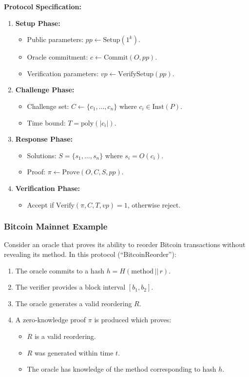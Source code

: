 \documentclass[11pt]{article}
\begin{document}
\noindent\textbf{Protocol Specification:}
\begin{enumerate}[label=(\arabic*)]
    \item \textbf{Setup Phase:}
    \begin{itemize}
      \item Public parameters: $pp \leftarrow \text{Setup}(1^k)$.
      \item Oracle commitment: $c \leftarrow \text{Commit}(O, pp)$.
      \item Verification parameters: $vp \leftarrow \text{VerifySetup}(pp)$.
    \end{itemize}
    \item \textbf{Challenge Phase:}
    \begin{itemize}
      \item Challenge set: $C \leftarrow \{c_1, \dots, c_n\}$ where $c_i \in \text{Inst}(P)$.
      \item Time bound: $T = \text{poly}(|c_i|)$.
    \end{itemize}
    \item \textbf{Response Phase:}
    \begin{itemize}
      \item Solutions: $S = \{s_1, \dots, s_n\}$ where $s_i = O(c_i)$.
      \item Proof: $\pi \leftarrow \text{Prove}(O,C,S,pp)$.
    \end{itemize}
    \item \textbf{Verification Phase:}
    \begin{itemize}
      \item Accept if $\text{Verify}(\pi,C,T,vp)=1$, otherwise reject.
    \end{itemize}
\end{enumerate}

\subsubsection{Bitcoin Mainnet Example}

Consider an oracle that proves its ability to reorder Bitcoin transactions without revealing its method. In this protocol (``BitcoinReorder''):
\begin{enumerate}[label=(\arabic*)]
    \item The oracle commits to a hash $h = H(\text{method} \, || \, r)$.
    \item The verifier provides a block interval $[b_1, b_2]$.
    \item The oracle generates a valid reordering $R$.
    \item A zero-knowledge proof $\pi$ is produced which proves:
    \begin{itemize}
        \item $R$ is a valid reordering.
        \item $R$ was generated within time $t$.
        \item The oracle has knowledge of the method corresponding to hash $h$.
    \end{itemize}
\end{enumerate}
\end{document}
